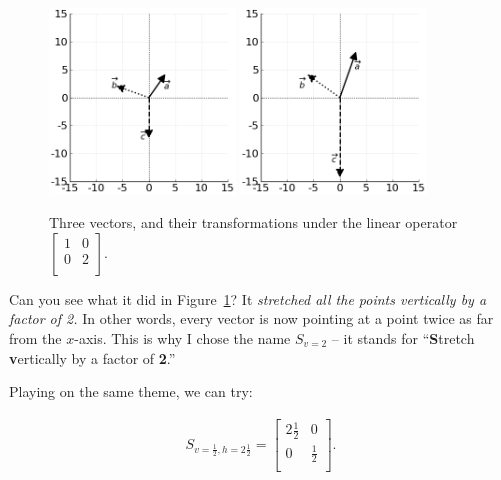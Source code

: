 \begin{figure}[ht]
\centering
\includegraphics[width=0.44\textwidth]{preoperators.png}
\includegraphics[width=0.44\textwidth]{vertstretchop.png}
\caption[.]{Three vectors, and their transformations under the linear operator 
{\scriptsize $\begin{bmatrix} 1 & 0 \\ 0 & 2 \\ \end{bmatrix}$.}}
\label{fig:vertstretchop}
\end{figure}

Can you see what it did in Figure~\ref{fig:vertstretchop}? It
\textit{stretched all the points vertically by a factor of 2.} In other words,
every vector is now pointing at a point twice as far from the $x$-axis. This is
why I chose the name $S_{v=2}$ -- it stands for ``\textbf{S}tretch
\textbf{v}ertically by a factor of \textbf{2}.''

\pagebreak

Playing on the same theme, we can try:

\vspace{-.15in}
\begin{align*}
S_{v=\frac{1}{2},h=2\frac{1}{2}} =
\begin{bmatrix}
2\frac{1}{2} & 0 \\
0 & \frac{1}{2} \\
\end{bmatrix}.
\end{align*}
\vspace{-.15in}

